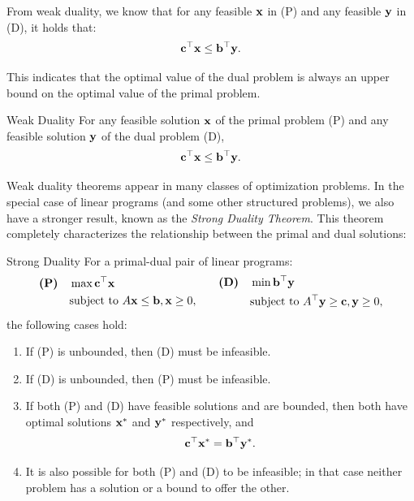 From weak duality, we know that for any feasible $\mathbf{x}$ in (P) and any feasible $\mathbf{y}$ in (D), it holds that:
\[
\mathbf{c}^\top \mathbf{x} \leq \mathbf{b}^\top \mathbf{y}.
\]

This indicates that the optimal value of the dual problem is always an upper bound on the optimal value of the primal problem.

\begin{theorem}{Weak Duality}\label{thm:weak-duality}
For any feasible solution $\mathbf{x}$ of the primal problem (P) and any feasible solution $\mathbf{y}$ of the dual problem (D), 
\[
\mathbf{c}^\top \mathbf{x} \leq \mathbf{b}^\top \mathbf{y}.
\]
\end{theorem}

Weak duality theorems appear in many classes of optimization problems. In the special case of linear programs (and some other structured problems), we also have a stronger result, known as the \emph{Strong Duality Theorem}. This theorem completely characterizes the relationship between the primal and dual solutions:

\begin{theorem}{Strong Duality}\label{thm:strong-duality}
For a primal-dual pair of linear programs:
\[
\begin{aligned}
\textbf{(P)} \quad &\max \mathbf{c}^\top \mathbf{x} \\
&\mbox{subject to } A \mathbf{x} \leq \mathbf{b}, \mathbf{x} \geq 0,
\end{aligned}
\quad\quad
\begin{aligned}
\textbf{(D)} \quad &\min \mathbf{b}^\top \mathbf{y} \\
&\mbox{subject to } A^\top \mathbf{y} \geq \mathbf{c}, \mathbf{y} \geq 0,
\end{aligned}
\]
the following cases hold:
\begin{enumerate}
\item  If (P) is unbounded, then (D) must be infeasible.
\item  If (D) is unbounded, then (P) must be infeasible.
\item  If both (P) and (D) have feasible solutions and are bounded, then both have optimal solutions $\mathbf{x}^*$ and $\mathbf{y}^*$ respectively, and 
\[
\mathbf{c}^\top \mathbf{x}^* = \mathbf{b}^\top \mathbf{y}^*.
\]
\item  It is also possible for both (P) and (D) to be infeasible; in that case neither problem has a solution or a bound to offer the other.
\end{enumerate}
\end{theorem}

